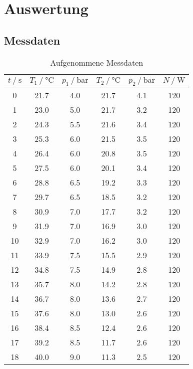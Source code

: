 \section{Auswertung}
\label{sec:Auswertung}
\subsection{Messdaten}
\begin{table}
  \centering
  \label{Aufgenommene Messdaten}
  \caption{Aufgenommene Messdaten}
  \begin{tabular}{S[table-format = 2.0] S[table-format = 2.1] S[table-format = 2.2] S[table-format = 2.1]
     S[table-format = 1.1] S[table-format = 3.0]}
     \toprule
     {$t \mathbin{/} \si{\second}$} & {$T_1 \mathbin{/}\si{\celsius}$} & {$p_1 \mathbin{/} \si{\bar}$} & {$T_2 \mathbin{/} \si{\celsius}$}
     & {$p_2 \mathbin{/} \si{\bar}$} & {$N \mathbin{/} \si{\watt}$} \\
     	& 21.7 &	4.0    &	21.7 & 4.1 & 120 \\
     1  & 23.0 &	5.0    &	21.7 & 3.2 & 120 \\
     2 	& 24.3 &	5.5    &	21.6 & 3.4 & 120 \\
     3 	& 25.3 &	6.0    &	21.5 & 3.5 & 120 \\
     4 	& 26.4 &	6.0    &	20.8 & 3.5 & 120 \\
     5 	& 27.5 &	6.0    &	20.1 & 3.4 & 120 \\
     6 	& 28.8 &	6.5    &	19.2 & 3.3 & 120 \\
     7 	& 29.7 &	6.5    &	18.5 & 3.2 & 120 \\
     8 	& 30.9 &	7.0    &	17.7 & 3.2 & 120 \\
     9 	& 31.9 &	7.0    &	16.9 & 3.0 & 120 \\
    10	& 32.9 &	7.0    &	16.2 & 3.0 & 120 \\
    11	& 33.9 &	7.5    &	15.5 & 2.9 & 120 \\
    12	& 34.8 &	7.5    &	14.9 & 2.8 & 120 \\
    13	& 35.7 &	8.0    &	14.2 & 2.8 & 120 \\
    14	& 36.7 &	8.0    &	13.6 & 2.7 & 120 \\
    15	& 37.6 &	8.0    &	13.0 & 2.6 & 120 \\
    16	& 38.4 &	8.5    &	12.4 & 2.6 & 120 \\
    17	& 39.2 &	8.5    &	11.7 & 2.6 & 120 \\
    18	& 40.0 &	9.0    &	11.3 & 2.5 & 120 \\

\end{tabular}
\end{table}
